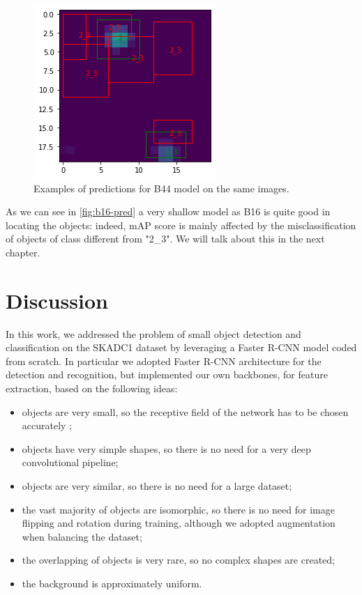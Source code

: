 \documentclass[a4paper,10pt]{report}
\begin{document}
\begin{figure}[!htb]
  \includegraphics[width=\linewidth]{b44_14365_16926_17629_20.png}
  \endminipage\hfill
  \caption{Examples of predictions for B44 model on the same images.}
  \label{fig:b44-pred}
\end{figure}



As we can see in \ref{fig:b16-pred} a very shallow model as B16 is quite good in locating the objects: indeed, mAP score is mainly affected by the misclassification of objects of class different from "2\_3".
We will talk about this in the next chapter.

\chapter{Discussion}\label{chap:discussion}

In this work, we addressed the problem of small object detection and classification on the SKADC1 dataset by leveraging a Faster R-CNN model coded from scratch.
In particular we adopted Faster R-CNN architecture for the detection and recognition, but implemented our own backbones, for feature extraction, based on the following ideas:
\begin{itemize}
\item objects are very small, so the receptive field of the network has to be chosen accurately \cite{effective-rf};
\item objects have very simple shapes, so there is no need for a very deep convolutional pipeline;
\item objects are very similar, so there is no need for a large dataset;
\item the vast majority of objects are isomorphic, so there is no need for image flipping and rotation during training, although we adopted augmentation when balancing the dataset;
\item the overlapping of objects is very rare, so no complex shapes are created;
\item the background is approximately uniform.
\end{itemize}
\end{document}
